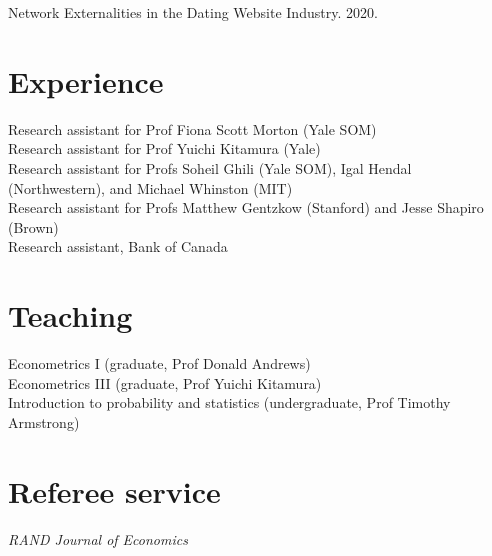 \documentclass[11pt]{article} %
\begin{document}
\medskip
Network Externalities in the Dating Website Industry. 2020.


\section*{Experience}

 Research assistant for Prof Fiona Scott Morton (Yale SOM) \\
 Research assistant for Prof Yuichi Kitamura (Yale) \\
 Research assistant for Profs Soheil Ghili (Yale SOM), Igal Hendal (Northwestern), and Michael Whinston (MIT) \\
  Research assistant for Profs Matthew Gentzkow (Stanford) and Jesse Shapiro (Brown) \\
 Research assistant, Bank of Canada \\

\section*{Teaching}

 Econometrics I (graduate, Prof Donald Andrews) \\
 Econometrics III (graduate, Prof Yuichi Kitamura) \\
 Introduction to probability and statistics (undergraduate, Prof Timothy Armstrong)

\section*{Referee service}

\textit{RAND Journal of Economics}


\vfill %
\end{document}
